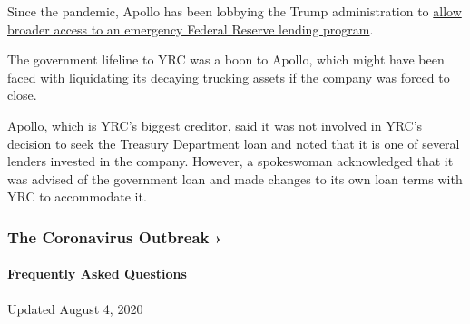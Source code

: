 Since the pandemic, Apollo has been lobbying the Trump administration to
\href{https://www.nytimes.com/2020/04/04/business/economy/apollo-federal-reserve-lending-talf.html}{allow
broader access to an emergency Federal Reserve lending program}.

The government lifeline to YRC was a boon to Apollo, which might have
been faced with liquidating its decaying trucking assets if the company
was forced to close.

Apollo, which is YRC's biggest creditor, said it was not involved in
YRC's decision to seek the Treasury Department loan and noted that it is
one of several lenders invested in the company. However, a spokeswoman
acknowledged that it was advised of the government loan and made changes
to its own loan terms with YRC to accommodate it.

\href{https://www.nytimes.com/news-event/coronavirus?action=click\&pgtype=Article\&state=default\&region=MAIN_CONTENT_3\&context=storylines_faq}{}

\hypertarget{the-coronavirus-outbreak-}{%
\subsubsection{The Coronavirus Outbreak
›}\label{the-coronavirus-outbreak-}}

\hypertarget{frequently-asked-questions}{%
\paragraph{Frequently Asked
Questions}\label{frequently-asked-questions}}

Updated August 4, 2020

